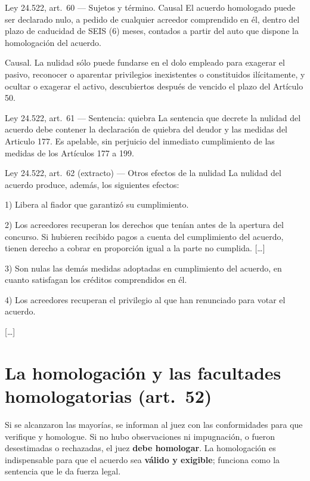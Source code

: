 \documentclass[12pt,oneside]{book}
\begin{document}
\begin{norma}{Ley 24.522, art.\ 60 --- Sujetos y término. Causal}
El acuerdo homologado puede ser declarado nulo, a pedido de cualquier acreedor comprendido en él, dentro del plazo de caducidad de SEIS (6) meses, contados a partir del auto que dispone la homologación del acuerdo.

Causal. La nulidad sólo puede fundarse en el dolo empleado para exagerar el pasivo, reconocer o aparentar privilegios inexistentes o constituidos ilícitamente, y ocultar o exagerar el activo, descubiertos después de vencido el plazo del Artículo 50.
\end{norma}

\begin{norma}{Ley 24.522, art.\ 61 --- Sentencia: quiebra}
La sentencia que decrete la nulidad del acuerdo debe contener la declaración de quiebra del deudor y las medidas del Articulo 177. Es apelable, sin perjuicio del inmediato cumplimiento de las medidas de los Artículos 177 a 199.
\end{norma}

\begin{norma}{Ley 24.522, art.\ 62 (extracto) --- Otros efectos de la nulidad}
La nulidad del acuerdo produce, además, los siguientes efectos:

1) Libera al fiador que garantizó su cumplimiento.

2) Los acreedores recuperan los derechos que tenían antes de la apertura del concurso. Si hubieren recibido pagos a cuenta del cumplimiento del acuerdo, tienen derecho a cobrar en proporción igual a la parte no cumplida. [\ldots]

3) Son nulas las demás medidas adoptadas en cumplimiento del acuerdo, en cuanto satisfagan los créditos comprendidos en él.

4) Los acreedores recuperan el privilegio al que han renunciado para votar el acuerdo.

[\ldots]
\end{norma}

\section{La homologación y las facultades homologatorias (art.\ 52)}

Si se alcanzaron las mayorías, se informan al juez con las conformidades para que verifique y homologue. Si no hubo observaciones ni impugnación, o fueron desestimadas o rechazadas, el juez \textbf{debe homologar}. La homologación es indispensable para que el acuerdo sea \textbf{válido y exigible}; funciona como la sentencia que le da fuerza legal.
\end{document}

